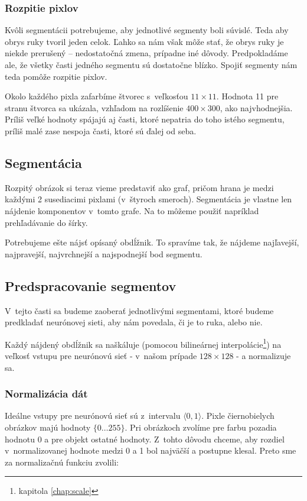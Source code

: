 \subsubsection{Rozpitie pixlov}

Kvôli segmentácii potrebujeme, aby jednotlivé segmenty boli súvislé. Teda aby obrys ruky tvoril jeden celok.
Ľahko sa nám však môže stať, že obrys ruky je niekde prerušený -- nedostatočná zmena, prípadne iné dôvody. Predpokladáme ale, že všetky časti jedného segmentu sú dostatočne blízko. Spojiť segmenty nám teda pomôže rozpitie pixlov. 

Okolo každého pixla zafarbíme štvorec s~veľkosťou $11\times 11$.
Hodnota 11 pre stranu štvorca sa ukázala, vzhľadom na rozlíšenie $400\times 300$, ako najvhodnejšia.
Príliš veľké hodnoty spájajú aj časti, ktoré nepatria do toho istého segmentu, príliš malé zase nespoja časti, ktoré sú ďalej od seba.

\subsection{Segmentácia}
\label{chap:segment}
Rozpitý obrázok si teraz vieme predstaviť ako graf, pričom hrana je medzi každými 2 susediacimi pixlami (v~štyroch smeroch). Segmentácia je vlastne len nájdenie komponentov v~tomto grafe. Na to môžeme použiť napríklad prehľadávanie do šírky. 

Potrebujeme ešte nájsť opísaný obdĺžnik. To spravíme tak, že nájdeme najľavejší, najpravejší, najvrchnejší a najspodnejší bod segmentu.

\subsection{Predspracovanie segmentov}
\label{sect:segmentpreprocessing}

V~tejto časti sa budeme zaoberať jednotlivými segmentami, ktoré budeme predkladať neurónovej sieti, aby nám povedala, či je to ruka, alebo nie.

Každý nájdený obdĺžnik sa naškáluje (pomocou bilineárnej interpolácie\footnote{kapitola \ref{chap:scale}}) na veľkosť vstupu pre neurónovú sieť - v~našom prípade $128\times 128$ - a normalizuje sa. 

\subsubsection{Normalizácia dát} 
\label{chap:normalisation}
Ideálne vstupy pre neurónovú sieť sú z~intervalu $\langle 0,1\rangle$. Pixle čiernobielych obrázkov majú hodnoty $\{0\dots 255\}$. Pri obrázkoch zvolíme pre farbu pozadia hodnotu 0 a pre objekt ostatné hodnoty. Z~tohto dôvodu chceme, aby rozdiel v~normalizovanej hodnote medzi 0 a 1 bol najväčší a postupne klesal. Preto sme za normalizačnú funkciu zvolili:

